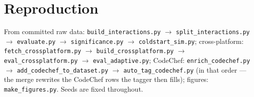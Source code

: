 \documentclass[12pt,a4paper]{article}
\begin{document}
\section{Reproduction}
\label{app:repro}
From committed raw data: \texttt{build\_interactions.py} $\to$ \texttt{split\_interactions.py}
$\to$ \texttt{evaluate.py} $\to$ \texttt{significance.py} $\to$ \texttt{coldstart\_sim.py};
cross-platform: \texttt{fetch\_crossplatform.py} $\to$ \texttt{build\_crossplatform.py}
$\to$ \texttt{eval\_crossplatform.py} $\to$ \texttt{eval\_adaptive.py}; CodeChef:
\texttt{enrich\_codechef.py} $\to$ \texttt{add\_codechef\_to\_dataset.py} $\to$
\texttt{auto\_tag\_codechef.py} (in that order --- the merge rewrites the CodeChef rows
the tagger then fills); figures: \texttt{make\_figures.py}. Seeds are fixed throughout.

\end{document}
